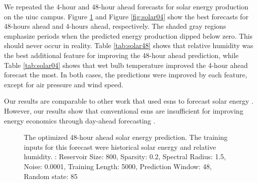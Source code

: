 We repeated the 4-hour and 48-hour ahead forecasts for solar energy production
on the \gls{uiuc} campus. Figure \ref{fig:solar48} and Figure \ref{fig:solar04}
show the best forecasts for 48-hours ahead and 4-hours ahead, respectively. The
shaded gray regions emphasize periods when   the predicted energy production
dipped below zero. This should never occur in reality. Table \ref{tab:solar48}
shows that relative humidity was the best additional feature for improving the
48-hour ahead prediction, while Table \ref{tab:solar04} shows that wet bulb
temperature improved the 4-hour ahead forecast the most. In both cases, the predictions were
improved by each feature, except for air pressure and wind speed.

Our results are comparable to other work that used \glspl{esn} to forecast
solar energy \cite{li_echo_2019}.
However, our results show that conventional \glspl{esn} are insufficient for
improving energy economics through day-ahead forecasting
\cite{brancucci_martinez-anido_value_2016}.

\begin{figure}[H]
  \centering
  \resizebox{\columnwidth}{!}{}
  \caption{The optimized 48-hour ahead solar energy prediction. The training inputs for
  this forecast were historical solar energy and relative humidity.
  : Reservoir Size: 800, Sparsity: 0.2, Spectral Radius:
  1.5, Noise: 0.0001, Training Length: 5000, Prediction Window: 48, Random
  state: 85}
  \label{fig:solar48}
\end{figure}

\begin{table*}[ht]
  \centering
  \caption{Tabulated error for 48-hour ahead solar energy forecasts with
  various coupled quantities.}
  \label{tab:solar48}
\end{table*}

